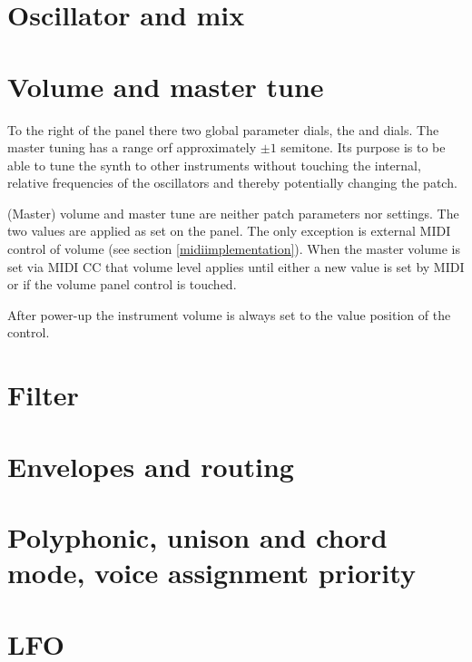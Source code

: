 \documentclass[landscape, 11pt, oneside]{report}
\newenvironment{flowtext}{\addmargin[0cm]{7cm}}{\endaddmargin} %
\begin{document}
\begin{flowtext}


\section{Oscillator and mix}\label{osc}



\section{Volume and master tune}

To the right of the panel there two global parameter dials, the \mastertune and \mastervol dials. The master tuning has a range orf approximately $\pm 1$ semitone. Its purpose is to be able to tune the synth to other instruments without touching the internal, relative frequencies of the oscillators and thereby potentially changing the patch.

(Master) volume and master tune are neither patch parameters nor settings. The two values are applied as set on the panel. The only exception is external MIDI control of volume (see section \ref{midiimplementation}). When the master volume is set via MIDI CC that volume level applies until either a new value is set by MIDI or if the volume panel control is touched. 

After power-up the instrument volume is always set to the value position of the \mastervol control.

\section{Filter}\label{filter}



\section{Envelopes and routing}\label{envelopes}



\section{Polyphonic, unison and chord mode, voice assignment priority}\label{poly-unison-voice}



\section{LFO}\label{lfo}


\end{flowtext}
\end{document}
